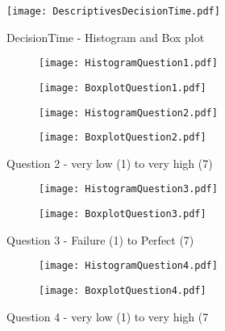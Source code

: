 \begin{figure}[htbp] %
\begin{center} 
\texttt{[image: DescriptivesDecisionTime.pdf]}
  \caption{DecisionTime - Histogram and Box plot}
    \label{DistributionDecisionTime} 
\end{center}
\end{figure}

\begin{figure}[!ht] %
\centering
  \caption[Question 1 - Histogram and Box plot]{Question 1 - very low (1) to very high (7)}
    \label{Question1}  
\begin{subfigure} 
\centering
\texttt{[image: HistogramQuestion1.pdf]}
\end{subfigure} 
\begin{subfigure} 
\centering
\texttt{[image: BoxplotQuestion1.pdf]}
\end{subfigure}
\end{figure}
\begin{figure}[H] %
\begin{center} 
\begin{subfigure} 
\centering
\texttt{[image: HistogramQuestion2.pdf]}
\end{subfigure} 
\begin{subfigure} 
\centering
\texttt{[image: BoxplotQuestion2.pdf]}
\end{subfigure}
  \caption[Question 2 - Histogram and Box plot]{Question 2 - very low (1) to very high (7)}
    \label{Question2} 
\end{center}
\end{figure}
\begin{figure}[htbp] %
\begin{center} 
\begin{subfigure} 
\centering
\texttt{[image: HistogramQuestion3.pdf]}
\end{subfigure} 
\begin{subfigure} 
\centering
\texttt{[image: BoxplotQuestion3.pdf]}
\end{subfigure}
  \caption[Question 3 - Histogram and Box plot]{Question 3 - Failure (1) to Perfect (7)}
    \label{Question3} 
\end{center}
\end{figure}
\begin{figure}[htbp] %
\begin{center} 
\begin{subfigure} 
\centering
\texttt{[image: HistogramQuestion4.pdf]}
\end{subfigure} 
\begin{subfigure} 
\centering
\texttt{[image: BoxplotQuestion4.pdf]}
\end{subfigure}
  \caption[Question 4 - Histogram and Box plot]{Question 4 - very low (1) to very high (7}
    \label{Question4} 
\end{center}
\end{figure}
